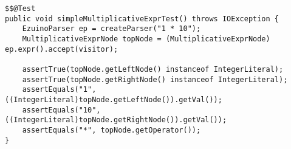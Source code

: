 \begin{lstlisting}[caption={Simple multiplication expression test}, label={test3}]
$$@Test
public void simpleMultiplicativeExprTest() throws IOException {
    EzuinoParser ep = createParser("1 * 10");
    MultiplicativeExprNode topNode = (MultiplicativeExprNode) ep.expr().accept(visitor);

    assertTrue(topNode.getLeftNode() instanceof IntegerLiteral);
    assertTrue(topNode.getRightNode() instanceof IntegerLiteral);
    assertEquals("1", ((IntegerLiteral)topNode.getLeftNode()).getVal());
    assertEquals("10", ((IntegerLiteral)topNode.getRightNode()).getVal());
    assertEquals("*", topNode.getOperator());
}
\end{lstlisting}